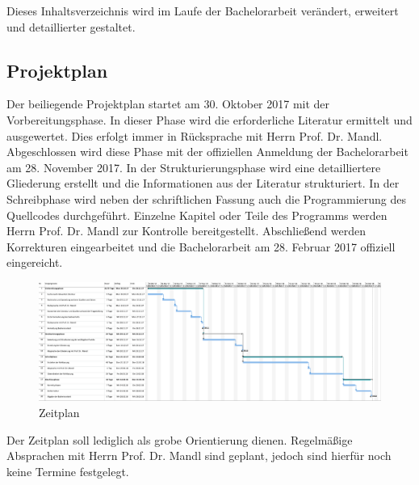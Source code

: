 \documentclass[11pt,a4paper,titlepage]{scrartcl}
\numberwithin{equation}{section}
\begin{document}
Dieses Inhaltsverzeichnis wird im Laufe der Bachelorarbeit verändert, erweitert und detaillierter gestaltet.

\newpage
	\subsection{Projektplan}
	Der beiliegende Projektplan startet am 30. Oktober 2017 mit der Vorbereitungsphase. In dieser Phase wird die erforderliche Literatur ermittelt und ausgewertet. Dies erfolgt immer in Rücksprache mit Herrn Prof. Dr. Mandl.  Abgeschlossen wird diese Phase mit der offiziellen Anmeldung der Bachelorarbeit am 28. November 2017. In der Strukturierungsphase wird eine detailliertere Gliederung erstellt und die Informationen aus der Literatur strukturiert. In der Schreibphase wird neben der schriftlichen Fassung auch die Programmierung des Quellcodes durchgeführt. Einzelne Kapitel oder Teile des Programms werden Herrn Prof. Dr. Mandl zur Kontrolle bereitgestellt. Abschließend werden Korrekturen eingearbeitet und die Bachelorarbeit am 28. Februar 2017 offiziell eingereicht.
	\begin{figure}[ht] \label{fig:tt}
		\begin{center}
			\includegraphics[scale=0.5]{img/tt.pdf}
			\caption{Zeitplan}
		\end{center}
	\end{figure}

Der Zeitplan soll lediglich als grobe Orientierung dienen. Regelmäßige Absprachen mit Herrn Prof. Dr. Mandl sind geplant, jedoch sind hierfür noch keine Termine festgelegt.  
\newpage
\end{document}
